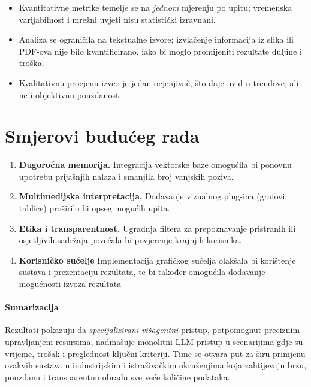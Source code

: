 \documentclass[zavrsnirad]{fer}
\begin{document}
\begin{itemize}[nosep]
  \item Kvantitativne metrike temelje se na \emph{jednom} mjerenju po
        upitu; vremenska varijabilnost i mrežni uvjeti nisu
        statistički izravnani.
  \item Analiza se ograničila na tekstualne izvore; izvlačenje
        informacija iz slika ili PDF-ova nije bilo kvantificirano,
        iako bi moglo promijeniti rezultate duljine i troška.
  \item Kvalitativnu procjenu izveo je jedan ocjenjivač, što daje
        uvid u trendove, ali ne i objektivnu pouzdanost.
\end{itemize}

\section{Smjerovi budućeg rada}

\begin{enumerate}[label=\arabic*.]
    \item \textbf{Dugoročna memorija.}  Integracija vektorske baze
        omogućila bi ponovnu upotrebu prijašnjih nalaza i smanjila
        broj vanjskih poziva.
    \item \textbf{Multimedijska interpretacija.}  Dodavanje vizualnog
        plug-ina (grafovi, tablice) proširilo bi opseg mogućih upita.
    \item \textbf{Etika i transparentnost.}  Ugradnja filtera za
        prepoznavanje pristranih ili osjetljivih sadržaja povećala bi
        povjerenje krajnjih korisnika.
    \item \textbf{Korisničko sučelje} Implementacija grafičkog sučelja olakšala bi              korištenje sustava i prezentaciju rezultata, te bi također omogućila dodavanje          mogućnosti izvoza rezultata
\end{enumerate}

\newpage
\paragraph{Sumarizacija}Rezultati pokazuju da \emph{specijalizirani
višagentni} pristup, potpomognut
preciznim upravljanjem resursima, nadmašuje
monolitni LLM pristup u scenarijima gdje su
vrijeme, trošak i preglednost ključni kriteriji.
Time se otvara put za širu primjenu ovakvih
sustava u industrijskim i istraživačkim okruženjima
koja zahtijevaju brzu, pouzdanu i
transparentnu obradu sve veće količine podataka.


\end{document}
